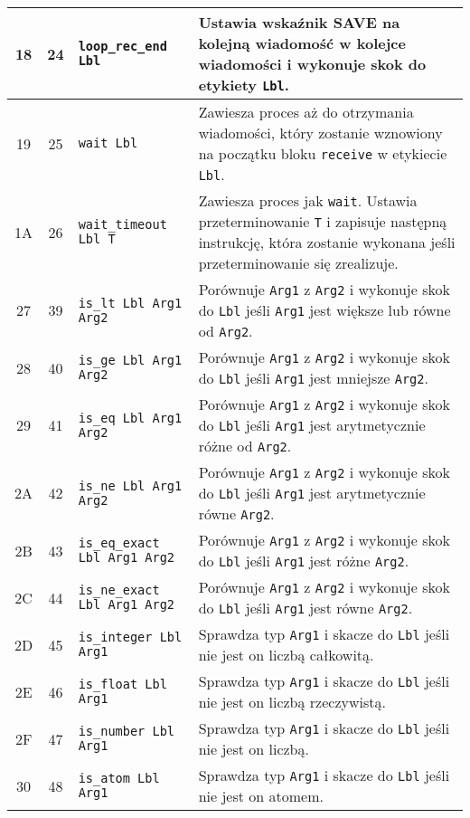 \begin{longtable}{|c|c|p{5cm}|p{7cm}|}
\hline
18 & 24 & \texttt{loop\_rec\_end Lbl} & Ustawia wskaźnik \textbf{SAVE} na kolejną wiadomość w kolejce wiadomości i wykonuje skok do etykiety \texttt{Lbl}. \\
\hline
19 & 25 & \texttt{wait Lbl} & Zawiesza proces aż do otrzymania wiadomości, który zostanie wznowiony na początku bloku \texttt{receive} w etykiecie \texttt{Lbl}.\\
\hline
1A & 26 & \texttt{wait\_timeout Lbl T} & Zawiesza proces jak \texttt{wait}. Ustawia przeterminowanie \texttt{T} i zapisuje następną instrukcję, która zostanie wykonana jeśli przeterminowanie się zrealizuje.\\
\hline
27 & 39 & \texttt{is\_lt Lbl Arg1 Arg2} & Porównuje \texttt{Arg1} z \texttt{Arg2} i wykonuje skok do \texttt{Lbl} jeśli \texttt{Arg1} jest większe lub równe od \texttt{Arg2}.\\
\hline
28 & 40 & \texttt{is\_ge Lbl Arg1 Arg2} & Porównuje \texttt{Arg1} z \texttt{Arg2} i wykonuje skok do \texttt{Lbl} jeśli \texttt{Arg1} jest mniejsze \texttt{Arg2}.\\
\hline
29 & 41 & \texttt{is\_eq Lbl Arg1 Arg2} & Porównuje \texttt{Arg1} z \texttt{Arg2} i wykonuje skok do \texttt{Lbl} jeśli \texttt{Arg1} jest arytmetycznie różne od \texttt{Arg2}.\\
\hline
2A & 42 & \texttt{is\_ne Lbl Arg1 Arg2} & Porównuje \texttt{Arg1} z \texttt{Arg2} i wykonuje skok do \texttt{Lbl} jeśli \texttt{Arg1} jest arytmetycznie równe \texttt{Arg2}.\\
\hline
2B & 43 & \texttt{is\_eq\_exact Lbl Arg1 Arg2} & Porównuje \texttt{Arg1} z \texttt{Arg2} i wykonuje skok do \texttt{Lbl} jeśli \texttt{Arg1} jest różne \texttt{Arg2}.\\
\hline
2C & 44 & \texttt{is\_ne\_exact Lbl Arg1 Arg2} & Porównuje \texttt{Arg1} z \texttt{Arg2} i wykonuje skok do \texttt{Lbl} jeśli \texttt{Arg1} jest równe \texttt{Arg2}.\\
\hline
2D & 45 & \texttt{is\_integer Lbl Arg1} & Sprawdza typ \texttt{Arg1} i skacze do \texttt{Lbl} jeśli nie jest on liczbą całkowitą.\\
\hline
2E & 46 & \texttt{is\_float Lbl Arg1} & Sprawdza typ \texttt{Arg1} i skacze do \texttt{Lbl} jeśli nie jest on liczbą rzeczywistą.\\
\hline
2F & 47 & \texttt{is\_number Lbl Arg1} & Sprawdza typ \texttt{Arg1} i skacze do \texttt{Lbl} jeśli nie jest on liczbą.\\
\hline
30 & 48 & \texttt{is\_atom Lbl Arg1} & Sprawdza typ \texttt{Arg1} i skacze do \texttt{Lbl} jeśli nie jest on atomem.\\

\end{longtable}
